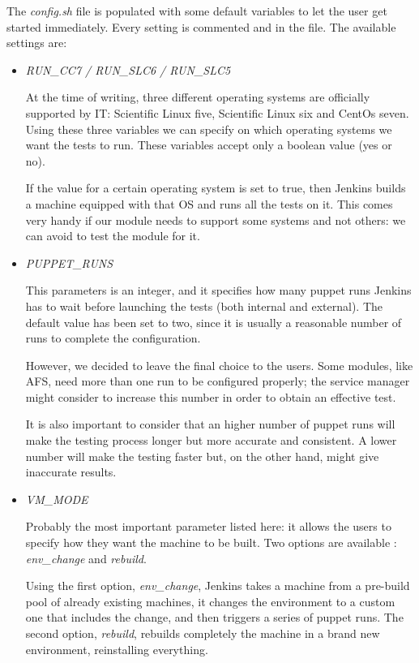 The \textit{config.sh} file is populated with some default variables to
let the user get started immediately. Every setting is commented and in
the file. The available settings are:

\begin{itemize}

  \item \textit{RUN\_CC7 / RUN\_SLC6 / RUN\_SLC5}

At the time of writing, three different operating systems are officially
supported by IT: Scientific Linux five, Scientific Linux six and CentOs
seven. Using these three variables we can specify on which operating
systems we want the tests to run. These variables accept only a boolean
value (yes or no).

If the value for a certain operating system is set to true, then Jenkins
builds a machine equipped with that OS and runs all the tests on it. This
comes very handy if our module needs to support some systems and not
others: we can avoid to test the module for it.

  \item \textit{PUPPET\_RUNS}

This parameters is an integer, and it specifies how many puppet runs
Jenkins has to wait before launching the tests (both internal and
external). The default value has been set to two, since it is usually
a reasonable number of runs to complete the configuration.

However, we decided to leave the final choice to the users. Some modules,
like AFS, need more than one run to be configured properly; the service
manager might consider to increase this number in order to obtain an
effective test.

It is also important to consider that an higher number of puppet runs will
make the testing process longer but more accurate and consistent. A lower
number will make the testing faster but, on the other hand, might give
inaccurate results.

  \item \textit{VM\_MODE}

Probably the most important parameter listed here: it allows the users to
specify how they want the machine to be built. Two options are available
: \textit{env\_change} and \textit{rebuild}.

Using the first option, \textit{env\_change}, Jenkins takes a machine from
a pre-build pool of already existing machines, it changes the environment
to a custom one that includes the change, and then triggers a series of
puppet runs. The second option, \textit{rebuild}, rebuilds completely the
machine in a brand new environment, reinstalling everything.


\end{itemize}
